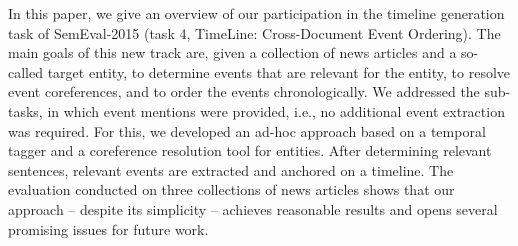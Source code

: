 In this paper, we give an overview of our participation in the timeline generation task of SemEval-2015 (task 4, TimeLine: Cross-Document Event Ordering). The main goals of this new track are, given a collection of news articles and a so-called target entity, to determine events that are relevant for the entity, to resolve event coreferences, and to order the events chronologically. We addressed the sub-tasks, in which event mentions were provided, i.e., no additional event extraction was required. For this, we developed an ad-hoc approach based on a temporal tagger and a coreference resolution tool for entities. After determining relevant sentences, relevant events are extracted and anchored on a timeline. The evaluation conducted on three collections of news articles shows that our approach -- despite its simplicity -- achieves reasonable results and opens several promising issues for future work.
